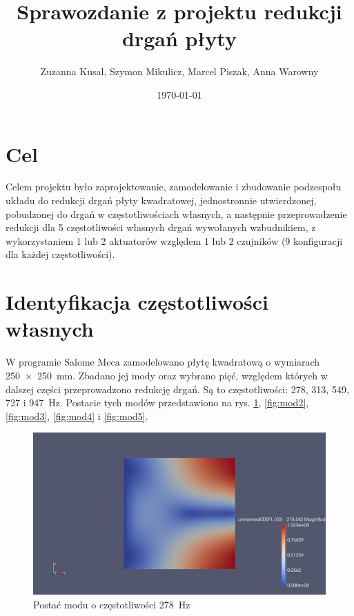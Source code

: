 \documentclass[polish,a4paper,11pt]{mwart}
\date{\today}
\author{Zuzanna Kusal, Szymon Mikulicz, Marcel Piszak, Anna Warowny}
\title{Sprawozdanie z projektu redukcji drgań płyty}
\let\Oldsection\section
\renewcommand{\section}{\FloatBarrier\Oldsection}
\begin{document}
\maketitle

\section{Cel}

Celem projektu było zaprojektowanie, zamodelowanie i zbudowanie podzespołu
układu do redukcji drgań płyty kwadratowej, jednostronnie utwierdzonej,
pobudzonej do drgań w częstotliwościach własnych, a następnie przeprowadzenie
redukcji dla 5 częstotliwości własnych drgań wywołanych wzbudnikiem, z
wykorzystaniem 1 lub 2 aktuatorów względem 1 lub 2 czujników (9 konfiguracji
dla każdej częstotliwości).

\section{Identyfikacja częstotliwości własnych}

W programie Salome Meca zamodelowano płytę kwadratową o wymiarach \SI{250 x 250}{\milli\meter}.
Zbadano jej mody oraz wybrano pięć, względem których w dalszej części
przeprowadzono redukcję drgań. Są to częstotliwości: 278, 313, 549, 727 i
\SI{947}{\hertz}. Postacie tych modów przedstawiono na rys. \ref{fig:mod1},
\ref{fig:mod2}, \ref{fig:mod3}, \ref{fig:mod4} i \ref{fig:mod5}.

\begin{figure}[!tbh]
  \centering
  \includegraphics[width=\textwidth]{./plate_vib/278Hz.png}
  \caption{Postać modu o częstotliwości \SI{278}{\hertz}}
  \label{fig:mod1}
\end{figure}
\end{document}
